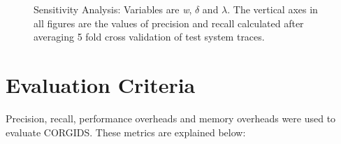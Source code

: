 \begin{figure}
    \qquad
    \caption{Sensitivity Analysis: Variables are \textit{w}, $\delta$ and $\lambda$. The vertical axes in all figures are the values of precision and recall calculated after averaging 5 fold cross validation of test system traces.}%
    \label{fig:sensitivityAnalysis}%
\end{figure}


\section{Evaluation Criteria}
\label{sec:metrics}

Precision, recall, performance overheads and memory overheads were used to evaluate \ac{CORGIDS}. These metrics are explained below:

